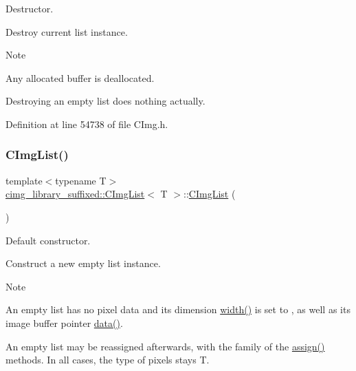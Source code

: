 Destructor. 

Destroy current list instance. \begin{DoxyNote}{Note}

\begin{DoxyItemize}
\item Any allocated buffer is deallocated.
\item Destroying an empty list does nothing actually. 
\end{DoxyItemize}
\end{DoxyNote}


Definition at line 54738 of file C\+Img.\+h.

\mbox{\label{structcimg__library__suffixed_1_1CImgList_a12d442d390d1544946e1d63149ebb821}} 
\subsubsection{\texorpdfstring{C\+Img\+List()}{CImgList()}\hspace{0.1cm}{\footnotesize\ttfamily [1/19]}}
{\footnotesize\ttfamily template$<$typename T$>$ \\
\hyperlink{structcimg__library__suffixed_1_1CImgList}{cimg\+\_\+library\+\_\+suffixed\+::\+C\+Img\+List}$<$ T $>$\+::\hyperlink{structcimg__library__suffixed_1_1CImgList}{C\+Img\+List} (\begin{DoxyParamCaption}{ }\end{DoxyParamCaption})\hspace{0.3cm}{\ttfamily [inline]}}



Default constructor. 

Construct a new empty list instance. \begin{DoxyNote}{Note}

\begin{DoxyItemize}
\item An empty list has no pixel data and its dimension \hyperlink{structcimg__library__suffixed_1_1CImgList_a60d81967a11f946a46ab28f2f14109f7}{width()} is set to {}, as well as its image buffer pointer \hyperlink{structcimg__library__suffixed_1_1CImgList_a7824337c659534a3412e5e2373aec595}{data()}.
\item An empty list may be reassigned afterwards, with the family of the \hyperlink{structcimg__library__suffixed_1_1CImgList_a8fbb044c1ccfe53144c926308f02279e}{assign()} methods. In all cases, the type of pixels stays {\ttfamily T}. 
\end{DoxyItemize}
\end{DoxyNote}


